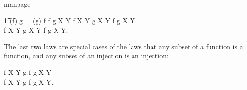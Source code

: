 \begin{pagestyle}{manpage}
\begin{laws}
\t1        (\dom f) \dres g = (\dom g) \dres f \implies f \cup g \in X \pfun Y
\also
        f \in X \pfun Y \land g \in X \pfun Y 
		\implies f \cap g \in X \pfun Y \\
        f \in X \pinj Y \land g \in X \pinj Y 
		\implies f \cap g \in X \pinj Y.
\end{laws}
The last two laws are special cases of the laws that any subset of a
function is a function, and any subset of an injection is an
injection:
\begin{laws}
	f \in X \pfun Y \land g \subseteq f \implies g \in X \pfun Y \\
	f \in X \pinj Y \land g \subseteq f 
		\implies g \in X \pinj Y.
\end{laws}
\newpage
\end{pagestyle}

